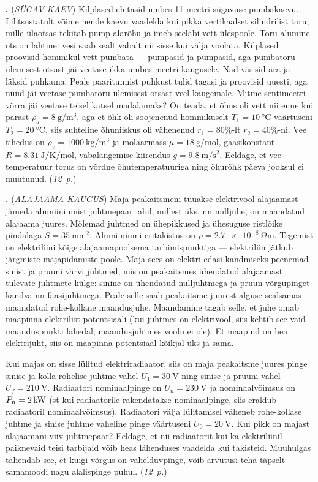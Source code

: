 \documentclass[11pt,a5paper]{article}
\newcommand{\numb}[1]{\vspace{5pt}\textbf{\large #1}}
\newcommand{\nimi}[1]{(\textsl{\small #1})}
\newcommand{\punktid}[1]{(\emph{#1~p.})}
\newcounter{ylesanne}
\newcommand{\yl}[1]{\addtocounter{ylesanne}{1}\numb{\theylesanne.} \nimi{#1} \newblock{}}
\newcommand{\autor}[1]{}%
\begin{document}
\yl{SÜGAV KAEV}
Kilplased ehitasid umbes 11 meetri sügavuse pumbakaevu. Lihtsustatult võime nende kaevu vaadelda kui pikka vertikaalset silindrilist toru, mille ülaotsas tekitab pump alarõhu ja imeb seeläbi vett ülespoole. Toru alumine ots on lahtine: vesi saab sealt vabalt nii sisse kui välja voolata. Kilplased proovisid hommikul vett pumbata --- pumpasid ja pumpasid, aga pumbatoru ülemisest otsast jäi veetase ikka umbes meetri kaugusele.  Nad väsisid ära ja läksid puhkama. Peale paaritunnist puhkust tulid tagasi ja proovisid uuesti, aga nüüd jäi  veetase pumbatoru ülemisest otsast veel kaugemale. Mitme sentimeetri võrra jäi veetase teisel katsel madalamaks? On teada, et õhus oli vett nii enne kui pärast $\rho_a=\SI{8}{\g\per\m\cubed}$, aga et õhk oli soojenenud hommikuselt $T_1=\SI{10}{\celsius}$ väärtuseni $T_2=\SI{20}{\celsius}$, siis suhteline õhuniiskus oli vähenenud $r_1=80\%$-lt $r_2=40\%$-ni. Vee tihedus on $\rho_v=\SI{1000}{\kg\per\m\cubed}$ ja molaarmass $\mu=\SI{18}{\g\per\mol}$, gaasikonstant $R=\SI{8.31}{\joule\per\kelvin\per\mol}$, vabalangemise kiirendus $g=\SI{9.8}{\m\per\s\squared}$. Eeldage, et vee temperatuur torus on võrdne õhutemperatuuriga ning õhurõhk päeva jooksul ei muutunud.
\punktid{12} \autor{Jaan Kalda}

\yl{ALAJAAMA KAUGUS}
Maja peakaitsmeni tuuakse elektrivool alajaamast jämeda alumiiniumist juhtmepaari abil, millest üks, nn nulljuhe, on maandatud alajaama juures. Mõlemad juhtmed on ühepikkused ja ühesuguse ristlõike pindalaga $S=\SI{35}{\mm\squared}$. Alumiiniumi eritakistus on $\rho=\SI{2.7e-8}{\ohm\m}$. Tegemist on elektriliini kõige alajaamapoolsema tarbimispunktiga --- elektriliin jätkub järgmiste majapidamiste poole. Maja sees on elektri edasi kandmiseks peenemad sinist ja pruuni värvi juhtmed, mis on peakaitsmes ühendatud alajaamast tulevate juhtmete külge: sinine on ühendatud nulljuhtmega ja pruun võrgupinget kandva nn faasijuhtmega. Peale selle saab peakaitsme juurest alguse sealsamas maandatud rohe-kollane maandusjuhe. Maandamine tagab selle, et juhe omab maapinna elektrilist potentsiaali (kui juhtmes on elektrivool, siis kehtib see vaid maanduspunkti lähedal; maandusjuhtmes voolu ei ole). Et maapind on hea elektrijuht, siis on maapinna potentsiaal kõikjal üks ja sama. 

Kui majas on sisse lülitud  elektriradiaator, siis on maja peakaitsme juures pinge sinise ja kolla-rohelise juhtme vahel $U_1=\SI{30}\V$  ning sinise ja pruuni vahel $U_f=\SI{210}\V$. Radiaatori nominaalpinge on $U_n=\SI{230}\V$ ja nominaalvõimsus on $P_n=\SI 2{\kW}$ (st kui radiaatorile rakendatakse nominaalpinge, siis eraldub radiaatoril nominaalvõimsus). Radiaatori välja lülitamisel väheneb rohe-kollase juhtme ja sinise juhtme vaheline pinge väärtuseni $U_0=\SI{20}\V$. Kui pikk on majast alajaamani viiv juhtmepaar? Eeldage, et nii radiaatorit kui ka elektriliinil paiknevaid teisi tarbijaid võib heas lähenduses vaadelda kui takisteid. Muuhulgas tähendab see, et kuigi võrgus on vahelduvpinge, võib arvutusi teha täpselt samamoodi nagu alalispinge puhul.
\punktid{12} \autor{Jaan Kalda}
\end{document}

